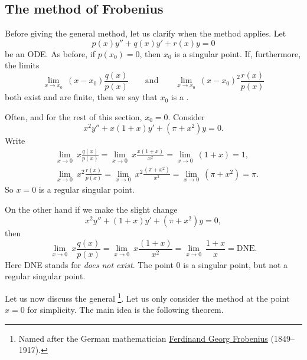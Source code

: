 \subsection{The method of Frobenius}

Before giving the general method, let us clarify when the method applies.
Let
\begin{equation*}
p(x) y'' + q(x) y' + r(x) y = 0
\end{equation*}
be an ODE\@.  As before, if $p(x_0) = 0$, then $x_0$ is a
singular point.  If, furthermore, the limits
\begin{equation*}
\lim_{x \to x_0} ~ (x-x_0) \frac{q(x)}{p(x)}
\qquad \text{and} \qquad
\lim_{x \to x_0} ~ (x-x_0)^2 \frac{r(x)}{p(x)}
\end{equation*}
both exist and are finite, then we say that $x_0$ is
a \emph{}.

\begin{example}
Often, and for the rest of this section, $x_0 = 0$.  Consider
\begin{equation*}
x^2y'' + x(1+x)y' + (\pi+x^2)y = 0 .
\end{equation*}
Write
\begin{align*}
& \lim_{x \to 0} ~x \frac{q(x)}{p(x)} = 
\lim_{x \to 0} ~x \frac{x(1+x)}{x^2} = \lim_{x \to 0} ~(1+x) = 1 ,
\\
& \lim_{x \to 0} ~x^2 \frac{r(x)}{p(x)} = 
\lim_{x \to 0} ~x^2 \frac{(\pi+x^2)}{x^2} = \lim_{x \to 0} ~(\pi+x^2) = \pi .
\end{align*}
So $x = 0$ is a regular singular point.

On the other hand if we make the slight change
\begin{equation*}
x^2y'' + (1+x)y' + (\pi+x^2)y = 0 ,
\end{equation*}
then
\begin{equation*}
\lim_{x \to 0} ~x \frac{q(x)}{p(x)} = 
\lim_{x \to 0} ~x \frac{(1+x)}{x^2} = \lim_{x \to 0} ~\frac{1+x}{x} =
\text{DNE}.
\end{equation*}
Here DNE stands for \emph{does not exist}.
The point $0$ is a singular point, but not a regular singular point.
\end{example}

Let us now discuss the general \emph{}%
\footnote{Named after the German mathematician
\href{http://en.wikipedia.org/wiki/Ferdinand_Georg_Frobenius}{Ferdinand
Georg Frobenius} (1849--1917).}.
Let us only consider the method at the point $x=0$ for simplicity.  The main
idea is the following theorem.

